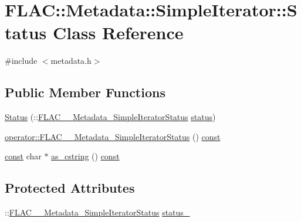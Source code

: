 \hypertarget{class_f_l_a_c_1_1_metadata_1_1_simple_iterator_1_1_status}{}\section{F\+L\+AC\+:\+:Metadata\+:\+:Simple\+Iterator\+:\+:Status Class Reference}
\label{class_f_l_a_c_1_1_metadata_1_1_simple_iterator_1_1_status}


{\ttfamily \#include $<$metadata.\+h$>$}

\subsection*{Public Member Functions}
\begin{DoxyCompactItemize}
\item 
\hyperlink{class_f_l_a_c_1_1_metadata_1_1_simple_iterator_1_1_status_ab10337fe1994c5981db4e54557b941fd}{Status} (\+::\hyperlink{group__flac__metadata__level1_gac926e7d2773a05066115cac9048bbec9}{F\+L\+A\+C\+\_\+\+\_\+\+Metadata\+\_\+\+Simple\+Iterator\+Status} \hyperlink{class_f_l_a_c_1_1_metadata_1_1_simple_iterator_a5e3b527b636a97cbe434b92949680174}{status})
\item 
\hyperlink{class_f_l_a_c_1_1_metadata_1_1_simple_iterator_1_1_status_a6db45e5dd1044ae13c95c0c7aa8f19d6}{operator\+::\+F\+L\+A\+C\+\_\+\+\_\+\+Metadata\+\_\+\+Simple\+Iterator\+Status} () \hyperlink{getopt1_8c_a2c212835823e3c54a8ab6d95c652660e}{const} 
\item 
\hyperlink{getopt1_8c_a2c212835823e3c54a8ab6d95c652660e}{const} char $\ast$ \hyperlink{class_f_l_a_c_1_1_metadata_1_1_simple_iterator_1_1_status_a51198c3d2a1c1cce04a47710cd36e1f6}{as\+\_\+cstring} () \hyperlink{getopt1_8c_a2c212835823e3c54a8ab6d95c652660e}{const} 
\end{DoxyCompactItemize}
\subsection*{Protected Attributes}
\begin{DoxyCompactItemize}
\item 
\+::\hyperlink{group__flac__metadata__level1_gac926e7d2773a05066115cac9048bbec9}{F\+L\+A\+C\+\_\+\+\_\+\+Metadata\+\_\+\+Simple\+Iterator\+Status} \hyperlink{class_f_l_a_c_1_1_metadata_1_1_simple_iterator_1_1_status_a4e60c55f551cfdfed02c1d4d1ceb23bf}{status\+\_\+}
\end{DoxyCompactItemize}


